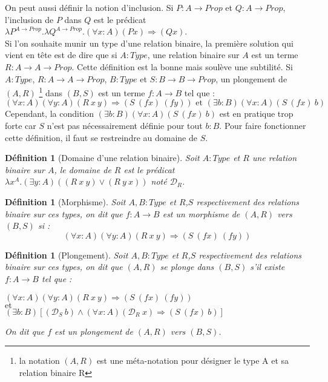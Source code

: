 \documentclass[a4paper,12pt]{article}
\theoremstyle{plain}
\newtheorem{defi}[theo]{Définition}
\begin{document}
On peut aussi définir la notion d'inclusion. Si $P : A \to \mathit{Prop}$ et $Q: A \to \mathit{Prop}$, l'inclusion de $P$ dans $Q$ est le prédicat $\lambda P^{A \to \mathit{Prop}}. \lambda Q^{A \to \mathit{Prop}}. (\forall x:A) (P x) \Rightarrow(Qx)$.\\

Si l'on souhaite munir un type d'une relation binaire, la première solution qui vient en tête est de dire que si $A: \mathit{Type}$, une relation binaire sur $A$ est un terme $R : A \to A \to \mathit{Prop}$. Cette définition est la bonne mais soulève une subtilité. Si $A: \mathit{Type}$, $R : A \to A \to \mathit{Prop}$, $B : \mathit{Type}$ et $S : B \to B \to \mathit{Prop}$, un plongement de $(A,R)$
\footnote{la notation $(A,R)$ est une méta-notation pour désigner le type A et sa relation binaire R} dans $(B,S)$ est un terme $f : A \to B$ tel que :
$$ (\forall x:A) (\forall y :A) (R \ x \ y) \Rightarrow( S \ (f x) \ (fy)) \text{ et } (\exists b : B) (\forall x:A) (S \ (fx) \ b)$$
Cependant, la condition $(\exists b : B) (\forall x:A) (S \ (fx) \ b)$ est en pratique trop forte car $S$ n'est pas nécessairement définie pour tout $b:B$. Pour faire fonctionner cette définition, il faut se restreindre au domaine de $S$.

\begin{defi}[Domaine d'une relation binaire]
Soit $A: \mathit{Type}$ et $R$ une relation binaire sur $A$, le domaine de $R$ est le prédicat $\lambda x^A.( \exists y:A)( (R \ x \ y) \lor (R \ y \ x))$ noté $\mathcal{D}_R$.
\end{defi}

\begin{defi}[Morphisme]
Soit $A,B : \mathit{Type}$ et $R$,$S$ respectivement des relations binaire sur ces types, on dit que $f: A \to B$ est un morphisme de $(A,R)$ vers $(B,S)$ si :
$$ (\forall x:A) (\forall y :A) (R \ x \ y) \Rightarrow( S \ (f x) \ (fy))$$
\end{defi}

\begin{defi}[Plongement]
Soit $A,B : \mathit{Type}$ et $R$,$S$ respectivement des relations binaire sur ces types, on dit que $(A,R)$ se plonge dans $(B,S)$ s'il existe $f : A \to B$ tel que :
\begin{center}
$ (\forall x:A) (\forall y :A) (R \ x \ y) \Rightarrow( S \ (f x) \ (fy))$ \\[3mm]
$ \text{et}$\\[3mm]
$ (\exists b : B)[(\mathcal{D}_S \  b) \land (\forall x:A) (\mathcal{D}_R \ x) \Rightarrow(S \ (fx) \ b)]$\\[3mm]
\end{center}
On dit que $f$ est un plongement de $(A,R)$ vers $(B,S)$.
\end{defi}
\end{document}
